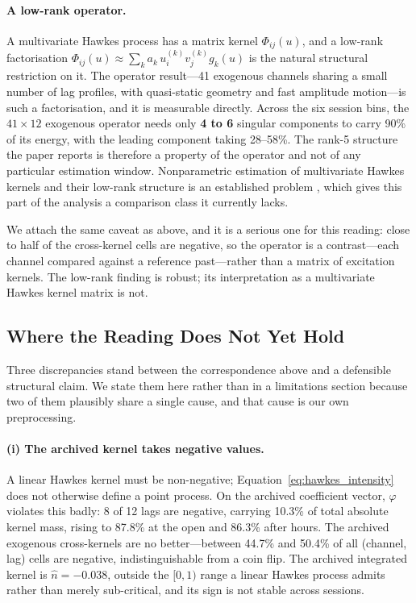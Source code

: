 \paragraph{A low-rank operator.} A multivariate Hawkes process has a matrix
kernel $\Phi_{ij}(u)$, and a low-rank factorisation
$\Phi_{ij}(u) \approx \sum_k a_k\, u^{(k)}_i v^{(k)}_j g_k(u)$ is the natural
structural restriction on it. The operator result---41 exogenous channels
sharing a small number of lag profiles, with quasi-static geometry and fast
amplitude motion---is such a factorisation, and it is measurable directly. Across the six session bins, the
$41 \times 12$ exogenous operator needs only \textbf{4 to 6} singular
components to carry 90\% of its energy, with the leading component taking
28--58\%. The rank-5 structure the paper reports is therefore a property of the
operator and not of any particular estimation window. Nonparametric estimation
of multivariate Hawkes kernels and their low-rank structure is an established
problem \citep{BacryGaiffasMuzy2015, AchabBacryGaiffas2017}, which gives this
part of the analysis a comparison class it currently lacks.

We attach the same caveat as above, and it is a serious one for this reading:
close to half of the cross-kernel cells are negative, so the operator is a
contrast---each channel compared against a reference past---rather than a
matrix of excitation kernels. The low-rank finding is robust; its
interpretation as a multivariate Hawkes kernel matrix is not.

\subsection{Where the Reading Does Not Yet Hold}
\label{sec:kernel_caveats}

Three discrepancies stand between the correspondence above and a defensible
structural claim. We state them here rather than in a limitations section
because two of them plausibly share a single cause, and that cause is our own
preprocessing.



\paragraph{(i) The archived kernel takes negative values.} A linear Hawkes
kernel must be non-negative; Equation~\eqref{eq:hawkes_intensity} does not
otherwise define a point process. On the archived coefficient vector,
$\varphi$ violates this badly: 8 of 12 lags are negative, carrying 10.3\% of
total absolute kernel mass, rising to 87.8\% at the open and 86.3\% after
hours. The archived exogenous cross-kernels are no better---between 44.7\% and
50.4\% of all (channel, lag) cells are negative, indistinguishable from a coin
flip. The archived integrated kernel is $\hat n = -0.038$, outside the
$[0,1)$ range a linear Hawkes process admits rather than merely sub-critical,
and its sign is not stable across sessions.


